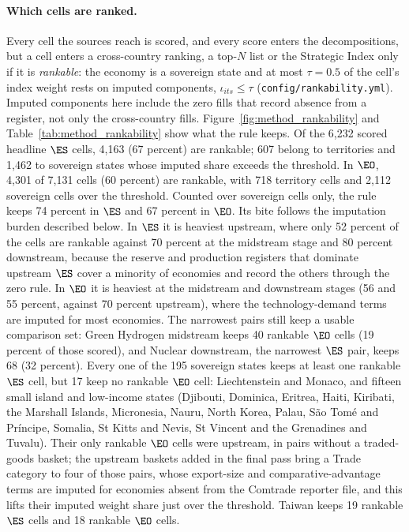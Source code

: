 \paragraph{Which cells are ranked.} Every cell the sources reach is scored, and every score
enters the decompositions, but a cell enters a cross-country ranking, a top-$N$ list or the
Strategic Index only if it is \emph{rankable}: the economy is a sovereign state and at most
$\tau=0.5$ of the cell's index weight rests on imputed components, $\iota_{its}\le\tau$
(\texttt{config/rankability.yml}). Imputed components here include the zero fills that record
absence from a register, not only the cross-country fills. Figure~\ref{fig:method_rankability} and
Table~\ref{tab:method_rankability} show what the rule keeps. Of the 6,232 scored headline $\ES$
cells, 4,163 (67 percent) are rankable; 607 belong to territories and 1,462 to sovereign states
whose imputed share exceeds the threshold. In $\EO$, 4,301 of 7,131 cells (60 percent) are
rankable, with 718 territory cells and 2,112 sovereign cells over the threshold. Counted over
sovereign cells only, the rule keeps 74 percent in $\ES$ and 67 percent in $\EO$. Its bite
follows the imputation burden described below. In $\ES$ it is heaviest upstream, where only 52
percent of the cells are rankable against 70 percent at the midstream stage and 80 percent
downstream, because the reserve and production registers that dominate upstream $\ES$ cover a
minority of economies and record the others through the zero rule. In $\EO$ it is heaviest at the
midstream and downstream stages (56 and 55 percent, against 70 percent upstream), where the
technology-demand terms are imputed for most economies. The narrowest pairs still keep a usable
comparison set: Green Hydrogen midstream keeps 40 rankable $\EO$ cells (19 percent of those
scored), and Nuclear downstream, the narrowest $\ES$ pair, keeps 68 (32 percent). Every one of
the 195 sovereign states keeps at least one rankable $\ES$ cell, but 17 keep no rankable $\EO$
cell: Liechtenstein and Monaco, and fifteen small island and low-income states (Djibouti,
Dominica, Eritrea, Haiti, Kiribati, the Marshall Islands, Micronesia, Nauru, North Korea, Palau,
S\~ao Tom\'e and Pr\'incipe, Somalia, St Kitts and Nevis, St Vincent and the Grenadines and
Tuvalu). Their only rankable $\EO$ cells were upstream, in pairs without a traded-goods basket; the
upstream baskets added in the final pass bring a Trade category to four of those pairs, whose
export-size and comparative-advantage terms are imputed for economies absent from the Comtrade
reporter file, and this lifts their imputed weight share just over the threshold. Taiwan keeps 19 rankable $\ES$ cells and 18 rankable $\EO$ cells.

